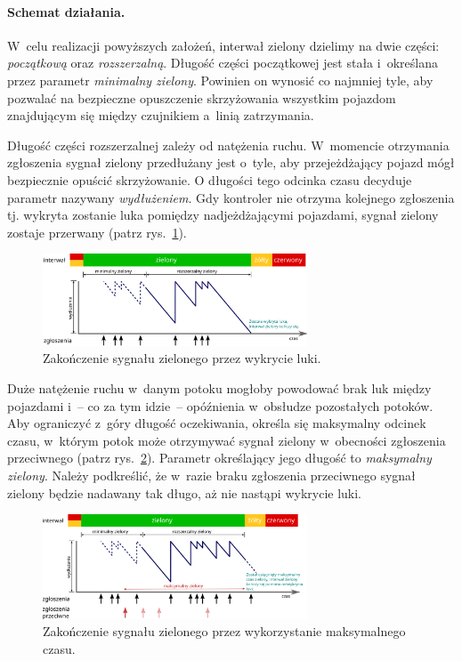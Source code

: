 \documentclass{pracamgr}
\newcommand{\imgr}[1]{rys.~\ref{#1}}
\theoremstyle{plain}
\begin{document}
\paragraph{Schemat działania.} W~celu realizacji powyższych założeń,
interwał zielony dzielimy na dwie części: \emph{początkową} oraz
\emph{rozszerzalną}. Długość części początkowej jest stała i~określana
przez parametr \emph{minimalny zielony}. Powinien on wynosić co
najmniej tyle, aby pozwalać na bezpieczne opuszczenie skrzyżowania
wszystkim pojazdom znajdującym się między czujnikiem a~linią
zatrzymania.

Długość części rozszerzalnej zależy od natężenia ruchu. W~momencie
otrzymania zgłoszenia sygnał zielony przedłużany jest o~tyle, aby
przejeżdżający pojazd mógł bezpiecznie opuścić skrzyżowanie. O
długości tego odcinka czasu decyduje parametr nazywany
\emph{wydłużeniem}. Gdy kontroler nie otrzyma kolejnego
zgłoszenia tj. wykryta zostanie luka pomiędzy nadjeżdżającymi
pojazdami, sygnał zielony zostaje przerwany (patrz
\imgr{img:gap-out}).

\begin{figure}[h] \centering
  \includegraphics[width=0.7\textwidth]{img/signals-gap-out}
  \caption{Zakończenie sygnału zielonego przez wykrycie luki.}
\label{img:gap-out}
\end{figure}

Duże natężenie ruchu w~danym potoku mogłoby powodować brak luk między
pojazdami i~-- co za tym idzie~-- opóźnienia w~obsłudze pozostałych
potoków. Aby ograniczyć z~góry długość oczekiwania, określa się
maksymalny odcinek czasu, w~którym potok może otrzymywać sygnał
zielony w~obecności zgłoszenia przeciwnego (patrz
\imgr{img:max-out}). Parametr określający jego długość to
\emph{maksymalny zielony}. Należy podkreślić, że w~razie braku
zgłoszenia przeciwnego sygnał zielony będzie nadawany tak długo, aż
nie nastąpi wykrycie luki.
\begin{figure}[h] \centering
  \includegraphics[width=0.7\textwidth]{img/signals-max-out}
  \caption{Zakończenie sygnału zielonego przez wykorzystanie
maksymalnego czasu.}
\label{img:max-out}
\end{figure}
\end{document}
